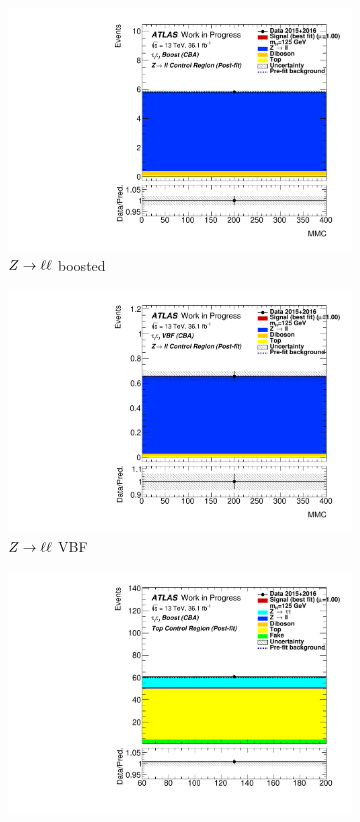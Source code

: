 \begin{figure}[htb]
    \centering
    \begin{subfigure}[t]{0.45\textwidth}
        \includegraphics[width=\textwidth]{./plots/fit/cba/zll_boost.pdf}
        \caption{$Z \to \ell \ell$ boosted}
    \end{subfigure}
    \begin{subfigure}[t]{0.45\textwidth}
        \includegraphics[width=\textwidth]{./plots/fit/cba/zll_vbf.pdf}
        \caption{$Z \to \ell \ell$ VBF}
    \end{subfigure}
    \begin{subfigure}[t]{0.45\textwidth}
        \includegraphics[width=\textwidth]{./plots/fit/cba/top_boost.pdf}

\end{subfigure}
\end{figure}
